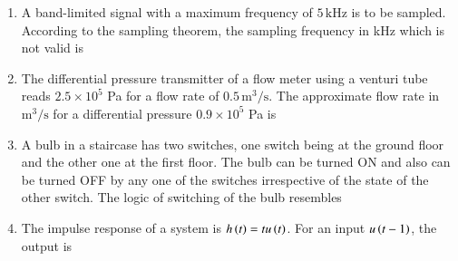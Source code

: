 \documentclass[journal,12pt,onecolumn]{IEEEtran}
\theoremstyle{remark}
\begin{document}
\begin{enumerate}
\item A band-limited signal with a maximum frequency of $5\,\text{kHz}$ is to be sampled. According to the sampling theorem, the sampling frequency in kHz which is not valid is  
\par \hfill{}
\begin{enumerate}
\end{enumerate}

\item The differential pressure transmitter of a flow meter using a venturi tube reads $2.5 \times 10^5$ Pa for a flow rate of $0.5\,\text{m}^3/\text{s}$. The approximate flow rate in $\text{m}^3/\text{s}$ for a differential pressure $0.9 \times 10^5$ Pa is  
\par \hfill{}
\begin{enumerate}
\end{enumerate}

\item A bulb in a staircase has two switches, one switch being at the ground floor and the other one at the first floor. The bulb can be turned ON and also can be turned OFF by any one of the switches irrespective of the state of the other switch. The logic of switching of the bulb resembles  
\par \hfill{}
\begin{enumerate}
\end{enumerate}

\item The impulse response of a system is $h\left(t\right) = t u\left(t\right)$. For an input $u\left(t-1\right)$, the output is  
\par \hfill{}
\begin{enumerate}
\end{enumerate}


\end{enumerate}
\end{document}
